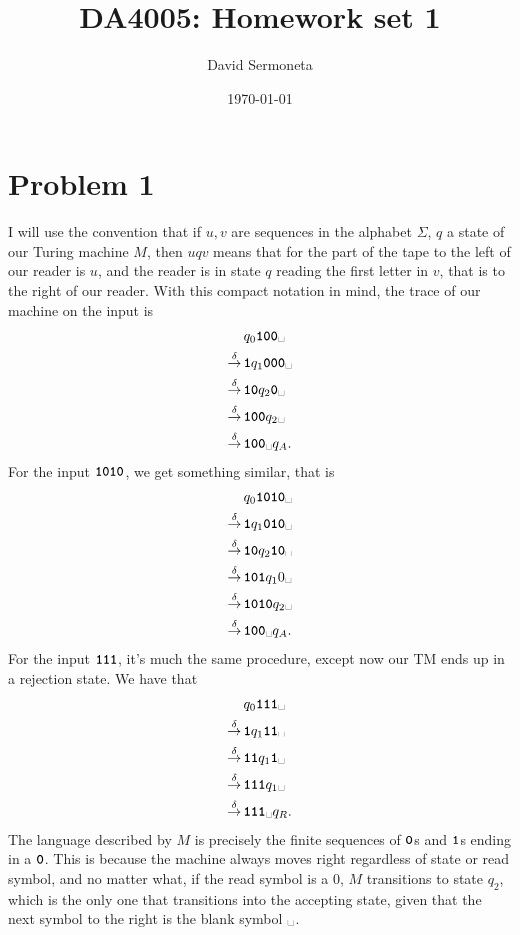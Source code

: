 \documentclass[11pt,a4paper]{article}
\title{DA4005: Homework set 1}
\author{David Sermoneta}
\date{\today}
\newcommand{\bl}{\ensuremath{\text{\textvisiblespace}}}
\newcommand{\word}[1]{\text{\textbf{\texttt{#1}}}}
\begin{document}
\maketitle
\section*{Problem 1}
I will use the convention that if $u,v$ are sequences in
the alphabet  $\Sigma$, $q$ a state of our Turing machine $M$, then $uqv$ means
that for the part of the tape to the left of our reader is $u$, and the reader
is in state $q$ reading the first letter in $v$, that is to the right of our
reader.
 With this compact notation in mind, the trace of our machine on the input
\word{100} is 
\begin{align*}
 & q_0 \word{100} \bl \\
   \stackrel{\delta}{\to} \, & \word{1} q_1 \word{000} \bl  \\
\stackrel{\delta}{\to} \, & \word{10}q_2 \word{0} \bl \\
\stackrel{\delta}{\to} \, & \word{100} q_2 \bl\\
\stackrel{\delta}{\to} \, & \word{100} \bl q_{A}.
\end{align*}
For the input $\word{1010}$, we get something similar, that is 
 \begin{align*}
  & q_0 \word{1010} \bl \\
\stackrel{\delta}{\to} \, & \word{1} q_1 \word{010}  \bl \\
\stackrel{\delta}{\to} \, & \word{10} q_2 \word{10} \bl \\
\stackrel{\delta}{\to} \, & \word{101} q_1 \text{0} \bl \\
\stackrel{\delta}{\to} \, & \word{1010} q_2  \bl \\
\stackrel{\delta}{\to} \, & \word{100} \bl q_{A}.
 \end{align*}
For the input $\word{111}$, it's much the same procedure, except now our TM ends up in a rejection state. We have that
\begin{align*}
&  q_0 \word{111} \bl \\
\stackrel{\delta}{\to} \, & \word{1} q_1 \word{11}  \bl \\
\stackrel{\delta}{\to} \, & \word{11} q_1 \word{1}  \bl \\
\stackrel{\delta}{\to} \, & \word{111} q_1  \bl \\
\stackrel{\delta}{\to} \, & \word{111} \bl q_R .
\end{align*}
The language described by $M$ is precisely the finite sequences of $\word{0}$s and $\word{1}$s ending in a $\word{0}$. This is because the machine always moves right regardless of state or read symbol, and no matter what, if the read symbol is a $0$, $M$ transitions to state $q_2$, which is the only one that transitions into the accepting state, given that the next symbol to the right is the blank symbol $\bl$.
\end{document}

